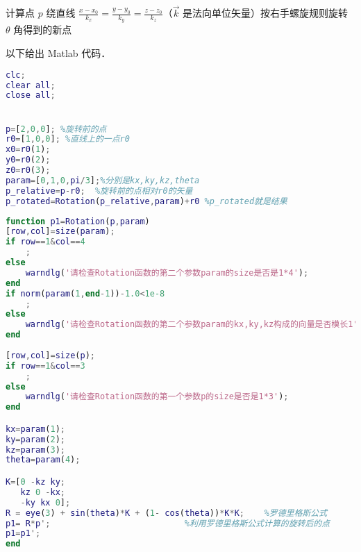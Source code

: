 
\begin{issues}
\issueDraft
\end{issues}



计算点 $p$ 绕直线 $\frac{x-x_0}{k_x}=\frac{y-y_0}{k_y}=\frac{z-z_0}{k_z}$（$\vec{k}$ 是法向单位矢量）按右手螺旋规则旋转 $\theta$ 角得到的新点

以下给出 Matlab 代码．


\begin{lstlisting}[language=matlab]
%main.m
clc;
clear all;
close all;


p=[2,0,0]; %旋转前的点
r0=[1,0,0]; %直线上的一点r0
x0=r0(1);
y0=r0(2);
z0=r0(3);
param=[0,1,0,pi/3];%分别是kx,ky,kz,theta
p_relative=p-r0;  %旋转前的点相对r0的矢量
p_rotated=Rotation(p_relative,param)+r0 %p_rotated就是结果

\end{lstlisting}



\begin{lstlisting}[language=matlab]
% Rotaion.m
function p1=Rotation(p,param)
[row,col]=size(param);
if row==1&col==4 
    ;
else
    warndlg('请检查Rotation函数的第二个参数param的size是否是1*4');
end
if norm(param(1,end-1))-1.0<1e-8
    ;
else
    warndlg('请检查Rotation函数的第二个参数param的kx,ky,kz构成的向量是否模长1')
end   
    
[row,col]=size(p);
if row==1&col==3
    ;
else 
    warndlg('请检查Rotation函数的第一个参数p的size是否是1*3');
end

kx=param(1);
ky=param(2);
kz=param(3);
theta=param(4);

K=[0 -kz ky;
   kz 0 -kx;
   -ky kx 0];
R = eye(3) + sin(theta)*K + (1- cos(theta))*K*K;    %罗德里格斯公式
p1= R*p';                           %利用罗德里格斯公式计算的旋转后的点
p1=p1';
end
\end{lstlisting}


